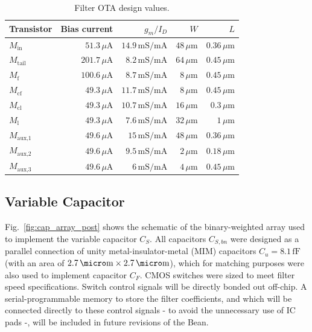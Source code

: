 \begin{table}[!t]
	\begin{center}
		\begin{tabular}{|l|r|r|r|r|}\hline
			Transistor & Bias current & $g_m/I_D$ & $W$ & $L$ \\ \hline\hline
			$M_\text{in}$ & $51.3\,\mu\text{A}$  & $14.9\,\text{mS}/\text{mA}$  & $48\,\mu\text{m}$ & $0.36\,\mu\text{m}$ \\ \hline
			$M_\text{tail}$ & $201.7\,\mu\text{A}$  & $8.2\,\text{mS}/\text{mA}$  & $64\,\mu\text{m}$ & $0.45\,\mu\text{m}$ \\ \hline 
			$M_\text{f}$ & $100.6\,\mu\text{A}$  & $8.7\,\text{mS}/\text{mA}$  & $8\,\mu\text{m}$ & $0.45\,\mu\text{m}$ \\ \hline
			$M_\text{cf}$ & $49.3\,\mu\text{A}$  & $11.7\,\text{mS}/\text{mA}$  & $8\,\mu\text{m}$ & $0.45\,\mu\text{m}$ \\ \hline
			$M_\text{cl}$ & $49.3\,\mu\text{A}$  & $10.7\,\text{mS}/\text{mA}$  & $16\,\mu\text{m}$ & $0.3\,\mu\text{m}$ \\ \hline
			$M_\text{l}$ & $49.3\,\mu\text{A}$  & $7.6\,\text{mS}/\text{mA}$  & $32\,\mu\text{m}$ & $1\,\mu\text{m}$ \\ \hline
			$M_\text{aux,1}$ & $49.6\,\mu\text{A}$  & $15\,\text{mS}/\text{mA}$  & $48\,\mu\text{m}$ & $0.36\,\mu\text{m}$ \\ \hline
			$M_\text{aux,2}$ & $49.6\,\mu\text{A}$  & $9.5\,\text{mS}/\text{mA}$  & $2\,\mu\text{m}$ & $0.18\,\mu\text{m}$ \\ \hline
			$M_\text{aux,3}$ & $49.6\,\mu\text{A}$  & $6\,\text{mS}/\text{mA}$  & $4\,\mu\text{m}$ & $0.45\,\mu\text{m}$ \\ \hline
		\end{tabular}
		\vspace*{5pt}
		\caption{Filter OTA design values.}
		\label{tab:OTA_sizes}
	\end{center}
\end{table}

\subsection{Variable Capacitor}
Fig.~\ref{fig:cap_array_post} shows the schematic of the binary-weighted array used to implement the variable capacitor $C_S$. All capacitors $C_{S,bn}$ were designed as a parallel connection of unity metal-insulator-metal (MIM) capacitors $C_u=8.1\,\text{fF}$  (with an area of $2.7\,\micro\text{m}\times2.7\,\micro\text{m}$), which for matching purposes were also used to implement capacitor $C_F$. CMOS switches were sized to meet filter speed specifications.  Switch control signals will be directly bonded out off-chip. A \mbox{serial-programmable} memory to store the filter coefficients, and which will be connected directly to these control signals - to avoid the \mbox{unnecessary} use of IC pads -, will be included in future revisions of the Bean.

